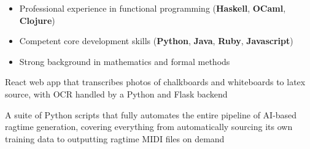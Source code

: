 
\begin{itemize}
    \item Professional experience in functional programming (\textbf{Haskell}, 
        \textbf{OCaml},
        \textbf{Clojure})
    \item Competent core development skills (\textbf{Python}, \textbf{Java}, 
    \textbf{Ruby}, \textbf{Javascript})
    \item Strong background in mathematics and formal methods
\end{itemize}

\medskip
{}

React web app that transcribes photos of chalkboards and whiteboards to latex 
source, with OCR handled by a Python and Flask backend

\divider

A suite of Python scripts that fully automates the entire pipeline of
AI-based ragtime generation, covering everything from automatically sourcing 
its own training data to outputting ragtime MIDI files on demand

\medskip
{}

\smallskip
{}

\smallskip
\divider


\smallskip
\divider






